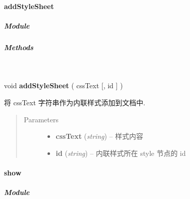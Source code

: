 \documentclass[letterpaper,10pt,english]{sphinxmanual}
\begin{document}
\paragraph{addStyleSheet}
\label{api/core/dom/addStyleSheet:addstylesheet}\label{api/core/dom/addStyleSheet::doc}

\subparagraph{Module}
\label{api/core/dom/addStyleSheet:module}\begin{quote}

{\hyperref[api/core/dom/index:module-DOM]{}}
\end{quote}


\subparagraph{Methods}
\label{api/core/dom/addStyleSheet:methods}

\begin{fulllineitems}
\label{api/core/dom/addStyleSheet:DOM.addStyleSheet}~
\begin{DUlineblock}{0em}
\item[] void \textbf{addStyleSheet} ( cssText {[}, id {]} )
\item[] 将 cssText 字符串作为内联样式添加到文档中.
\end{DUlineblock}
\begin{quote}\begin{description}
\item[{Parameters}] \leavevmode\begin{itemize}
\item {}
\textbf{cssText} (\emph{string}) -- 样式内容

\item {}
\textbf{id} (\emph{string}) -- 内联样式所在 style 节点的 id

\end{itemize}

\end{description}\end{quote}

\end{fulllineitems}



\paragraph{show}
\label{api/core/dom/show::doc}\label{api/core/dom/show:show}

\subparagraph{Module}
\label{api/core/dom/show:module}\begin{quote}

{\hyperref[api/core/dom/index:module-DOM]{}}
\end{quote}
\end{document}
